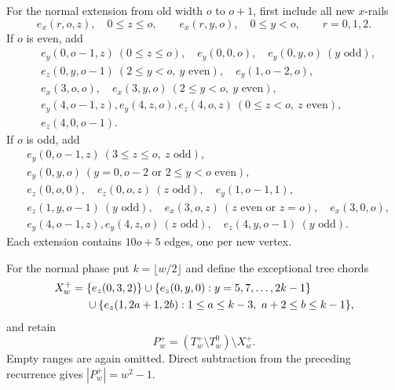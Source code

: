 \documentclass[11pt]{article}
\begin{document}
For the normal extension from old width \(o\) to \(o+1\), first include all
new \(x\)-rails
\[
 e_x(r,o,z),\quad 0\leq z\leq o,
 \qquad
 e_x(r,y,o),\quad0\leq y<o,
 \qquad r=0,1,2.
\]
If \(o\) is even, add
\begin{align*}
&e_y(0,o-1,z)\ (0\leq z\leq o),\quad e_y(0,0,o),\quad
 e_y(0,y,o)\ (y\text{ odd}),\\
&e_z(0,y,o-1)\ (2\leq y<o,\ y\text{ even}),\quad e_y(1,o-2,o),\\
&e_x(3,o,o),\quad e_x(3,y,o)\ (2\leq y<o,\ y\text{ even}),\\
&e_y(4,o-1,z),e_y(4,z,o),e_z(4,o,z)\ (0\leq z<o,\ z\text{ even}),\\
&e_z(4,0,o-1).
\end{align*}
If \(o\) is odd, add
\begin{align*}
&e_y(0,o-1,z)\ (3\leq z\leq o,\ z\text{ odd}),\\
&e_y(0,y,o)\ (y=0,o-2\text{ or }2\leq y<o\text{ even}),\\
&e_z(0,o,0),\quad e_z(0,o,z)\ (z\text{ odd}),\quad e_y(1,o-1,1),\\
&e_z(1,y,o-1)\ (y\text{ odd}),\quad
 e_x(3,o,z)\ (z\text{ even or }z=o),\quad e_x(3,0,o),\\
&e_y(4,o-1,z),e_y(4,z,o)\ (z\text{ odd}),\quad
 e_z(4,y,o-1)\ (y\text{ odd}).
\end{align*}
Each extension contains \(10o+5\) edges, one per new vertex.

For the normal phase put \(k=\lfloor w/2\rfloor\) and define the exceptional
tree chords
\begin{align}\label{eq:Xplus}
 X_w^+={}&\{e_z(0,3,2)\}
 \cup\{e_z(0,y,0):y=5,7,\ldots,2k-1\}\notag\\
 &\cup\{e_z(1,2a+1,2b):1\leq a\leq k-3,\ a+2\leq b\leq k-1\},
\end{align}
and retain
\begin{equation}\label{eq:Pplus}
 P_w^+=(T_w^+\setminus T_w^0)\setminus X_w^+.
\end{equation}
Empty ranges are again omitted.  Direct subtraction from the preceding
recurrence gives \(|P_w^+|=w^2-1\).
\end{document}
